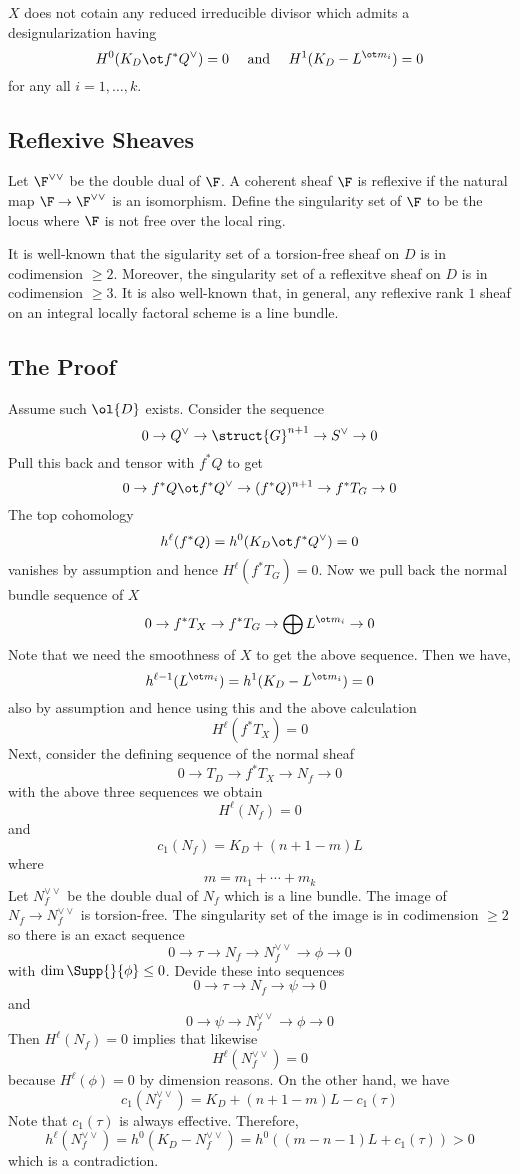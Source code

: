\documentclass[12pt]{article}
\theoremstyle{plain}
\begin{document}
\begin{prop}
$X$ does not cotain any reduced irreducible divisor which admits a designularization having
\[ H^0(K_D \ot f^* Q^\vee) = 0 \quad \text{ and } \quad H^1(K_D - L^{\ot m_i}) = 0 \]
for any all $i = 1, \dots, k$.
\end{prop}

\subsection{Reflexive Sheaves}

Let $\F^{\vee \vee}$ be the double dual of $\F$. A coherent sheaf $\F$ is reflexive if the natural map $\F \to \F^{\vee \vee}$ is an isomorphism. Define the singularity set of $\F$ to be the locus where $\F$ is not free over the local ring.
\par
It is well-known that the sigularity set of a torsion-free sheaf on $D$ is in codimension $\ge 2$. Moreover, the singularity set of a reflexitve sheaf on $D$ is in codimension $\ge 3$. It is also well-known that, in general, any reflexive rank $1$ sheaf on an integral locally factoral scheme is a line bundle.

\subsection{The Proof}

Assume such $\ol{D}$ exists. Consider the sequence
\[ 0 \to Q^\vee \to \struct{G}^{n+1} \to S^\vee \to 0 \]
Pull this back and tensor with $f^* Q$ to get
\[ 0 \to f^* Q \ot f^* Q^\vee \to (f^* Q)^{n+1} \to f^* T_G \to 0 \]
The top cohomology
\[ h^\ell(f^* Q) = h^0(K_D \ot f^* Q^\vee) = 0 \]
vanishes by assumption and hence $H^\ell(f^* T_G) = 0$. Now we pull back the normal bundle sequence of $X$
\[ 0 \to f^* T_X \to f^* T_G \to \bigoplus L^{\ot m_i} \to 0 \]
Note that we need the smoothness of $X$ to get the above sequence. Then we have,
\[ h^{\ell-1}(L^{\ot m_i}) = h^1(K_D - L^{\ot m_i}) = 0 \]
also by assumption and hence using this and the above calculation
\[ H^\ell(f^* T_X) = 0 \]
Next, consider the defining sequence of the normal sheaf
\[ 0 \to T_D \to f^* T_X \to N_f \to 0 \]
with the above three sequences we obtain
\[ H^\ell(N_f) = 0 \]
and
\[ c_1(N_f) = K_D + (n + 1 - m) L \]
where
\[ m  = m_1 + \cdots + m_k \]
Let $N_f^{\vee \vee}$ be the double dual of $N_f$ which is a line bundle. The image of $N_f \to N_f^{\vee \vee}$ is torsion-free. The singularity set of the image is in codimension $\ge 2$ so there is an exact sequence
\[ 0 \to \tau \to N_f \to N_f^{\vee \vee} \to \phi \to 0 \]
with $\dim{\Supp{}{\phi}} \le 0$. Devide these into sequences
\[ 0 \to \tau \to N_f \to \psi \to 0 \]
and
\[ 0 \to \psi \to N_f^{\vee \vee} \to \phi \to 0 \]
Then $H^\ell(N_f) = 0$ implies that likewise
\[ H^\ell(N_f^{\vee \vee}) = 0 \]
because $H^\ell(\phi) = 0$ by dimension reasons. On the other hand, we have 
\[ c_1(N_f^{\vee \vee}) = K_D + (n + 1 - m)L - c_1(\tau) \]
Note that $c_1(\tau)$ is always effective. Therefore,
\[ h^\ell(N_f^{\vee \vee}) = h^0(K_D - N_f^{\vee \vee}) = h^0((m - n - 1)L + c_1(\tau)) > 0 \]
which is a contradiction. 
\end{document}

